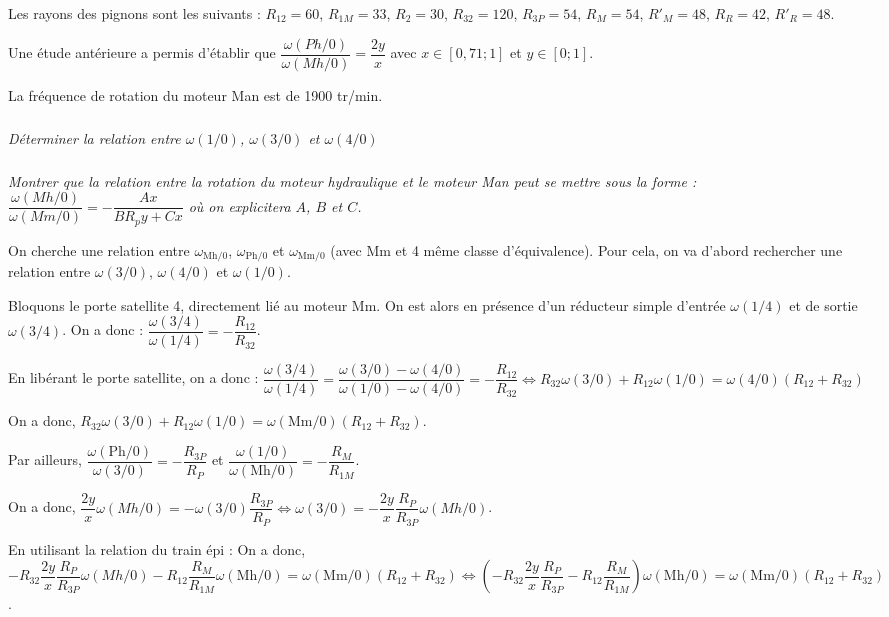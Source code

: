 \documentclass[10pt,fleqn]{article} %
\begin{document}
\begin{multicols}{2}
Les rayons des pignons sont les suivants : $R_{12}=60$, $R_{1M}=33$, $R_{2}=30$, $R_{32}=120$, $R_{3P}=54$, $R_{M}=54$, $R'_{M}=48$, $R_{R}=42$, $R'_{R}=48$. 

Une étude antérieure a permis d'établir que $\dfrac{\omega(Ph/0)}{\omega(Mh/0)} = \dfrac{2y}{x}$ avec $x\in[0,71;1]$ et $y\in[0;1]$.

La fréquence de rotation du moteur Man est de 1900 tr/min.
\subparagraph{}
\textit{Déterminer la relation entre $\omega(1/0)$, $\omega(3/0)$ et $\omega(4/0)$}

\subparagraph{}
\textit{Montrer que la relation entre la rotation du moteur hydraulique et le moteur Man peut se mettre sous la forme : $\dfrac{\omega(Mh/0)}{\omega(Mm/0)}=-\dfrac{Ax}{BR_py + Cx}$ où on explicitera $A$, $B$ et $C$.}


\ifprof
\begin{corrige}
On cherche une relation entre $\omega_{\text{Mh}/0}$, $\omega_{\text{Ph}/0}$ et $\omega_{\text{Mm}/0}$ (avec Mm et 4 même classe d'équivalence). Pour cela, on va d'abord rechercher une relation entre $\omega(3/0)$, $\omega(4/0)$ et $\omega(1/0)$.

Bloquons le porte satellite 4, directement lié au moteur Mm. On est alors en présence d'un réducteur simple d'entrée  $\omega(1/4)$ et de sortie $\omega(3/4)$. On a donc : 
$\dfrac{\omega(3/4)}{\omega(1/4)} = -\dfrac{R_{12}}{R_{32}}$. 

En libérant le porte satellite, on a donc :
$ \dfrac{\omega(3/4)}{\omega(1/4)}
= \dfrac{\omega(3/0)-\omega(4/0)}{\omega(1/0)-\omega(4/0)}
= -\dfrac{R_{12}}{R_{32}}
\Leftrightarrow 
R_{32} \omega(3/0) +R_{12}\omega(1/0) = \omega(4/0)\left(R_{12}+R_{32}\right)$

On a donc, $R_{32} \omega(3/0) +R_{12}\omega(1/0) = \omega(\text{Mm}/0)\left(R_{12}+R_{32}\right)$.

Par ailleurs, $\dfrac{\omega(\text{Ph}/0)}{\omega(3/0)} = -\dfrac{R_{3P}}{R_P}$ et 
$\dfrac{\omega(1/0)}{\omega(\text{Mh}/0)} = -\dfrac{R_M}{R_{1M}}$.

On a donc, $ \dfrac{2y}{x} \omega(Mh/0)= -\omega(3/0)\dfrac{R_{3P}}{R_P} \Leftrightarrow  \omega(3/0) = -\dfrac{2y}{x} \dfrac{R_P}{R_{3P}}\omega(Mh/0)$.

En utilisant la relation du train épi :
On a donc, $-R_{32} \dfrac{2y}{x} \dfrac{R_P}{R_{3P}}\omega(Mh/0)  -R_{12} \dfrac{R_M}{R_{1M}} \omega(\text{Mh}/0) = \omega(\text{Mm}/0)\left(R_{12}+R_{32}\right) \Leftrightarrow \left(-R_{32} \dfrac{2y}{x} \dfrac{R_P}{R_{3P}}  -R_{12} \dfrac{R_M}{R_{1M}} \right)\omega(\text{Mh}/0) = \omega(\text{Mm}/0)\left(R_{12}+R_{32}\right)$.



\end{corrige}
\end{multicols}
\end{document}
